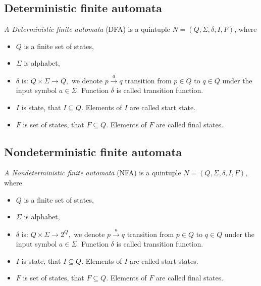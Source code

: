 	\subsection{Deterministic finite automata}
	\label{defDFA}
	\begin{definition}
		\emph{A Deterministic finite automata} (DFA) is a quintuple $N=(Q,\Sigma,\delta,I,F)$, where
		\begin{itemize}
			\item $Q$ is a finite set of states,
			\item $\Sigma$ is alphabet,
			\item $\delta$ is: $Q \times \Sigma \rightarrow Q,$ we denote $p \xrightarrow{a} q$ transition from $p \in Q$ to $q \in Q$ 
under the input symbol $a \in \Sigma$. 
Function $\delta$ is called transition function.
			\item $I$ is state, that $I \subseteq Q$. Elements of $I$ are called start state.
			\item $F$ is set of states, that $F \subseteq Q$. Elements of $F$ are called final states.
		\end{itemize}
	\end{definition}

	\subsection{Nondeterministic finite automata}
	\label{defNFA}
	\begin{definition}
		\emph{A Nondeterministic finite automata} (NFA) is a quintuple $N=(Q,\Sigma,\delta,I,F)$, where
		\begin{itemize}
			\item $Q$ is a finite set of states,
			\item $\Sigma$ is alphabet,
			\item $\delta$ is: $Q \times \Sigma \rightarrow 2^Q,$ we denote $p \xrightarrow{a} q$ transition from $p \in Q$ to $q \in Q$ 
under the input symbol $a \in \Sigma$. 
Function $\delta$ is called transition function.
			\item $I$ is state, that $I \subseteq Q$. Elements of $I$ are called start states.
			\item $F$ is set of states, that $F \subseteq Q$. Elements of $F$ are called final states.
		\end{itemize}
	\end{definition}

